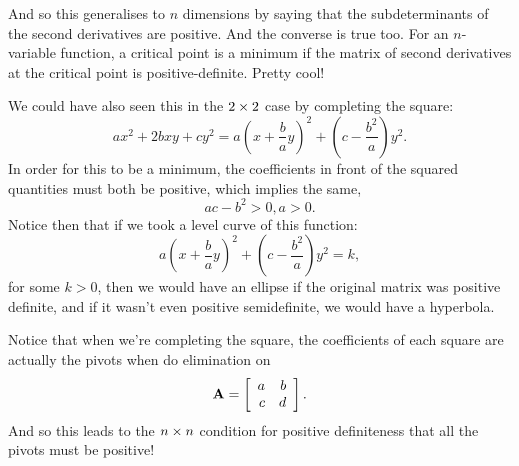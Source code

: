 And so this generalises to $n$ dimensions by saying that the subdeterminants of the second derivatives are positive. And the converse is true too. For an $n$-variable function, a critical point is a minimum if the matrix of second derivatives at the critical point is positive-definite. Pretty cool!

We could have also seen this in the $2 \times 2$ case by completing the square:
\[ ax^2 + 2bxy + cy^2 = a\left(x+\frac ba y\right)^2 + \left(c-\frac{b^2}a\right)y^2. \]
In order for this to be a minimum, the coefficients in front of the squared quantities must both be positive, which implies the same,
\[ ac-b^2 > 0, a > 0. \]
Notice then that if we took a level curve of this function:
\[ a\left(x+\frac ba y\right)^2 + \left(c-\frac{b^2}a\right)y^2 = k, \]
for some $k > 0$, then we would have an ellipse if the original matrix was positive definite, and if it wasn't even positive semidefinite, we would have a hyperbola. 

Notice that when we're completing the square, the coefficients of each square are actually the pivots when do elimination on 
\[ \boldsymbol{\mathbf{A}} = \left[ \begin{array}{rrrrrrrrrrrrrrrrrrrrrrrrr} a&b\\c&d\\ \end{array} \right]. \]
And so this leads to the $n \times n$ condition for positive definiteness that all the pivots must be positive!